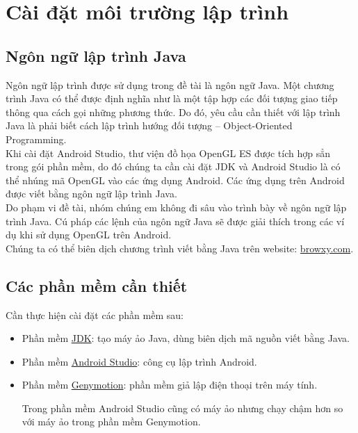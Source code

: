 \documentclass[13pt,a4paper]{extreport}
\begin{document}
\chapter{Cài đặt môi trường lập trình}
\section{Ngôn ngữ lập trình Java}
	Ngôn ngữ lập trình được sử dụng trong đề tài là ngôn ngữ Java. Một chương trình Java có thể được định nghĩa như là một tập hợp các đối tượng giao tiếp thông qua cách gọi những phương thức. Do đó, yêu cầu cần thiết với lập trình Java là phải biết cách lập trình hướng đối tượng -- Object-Oriented Programming.\\
	
	Khi cài đặt Android Studio, thư viện đồ họa OpenGL ES được tích hợp sẳn trong gói phần mềm, do đó chúng ta cần cài đặt JDK và Android Studio là có thể nhúng mã OpenGL vào các ứng dụng Android. Các ứng dụng trên Android được viết bằng ngôn ngữ lập trình Java.\\
	
	Do phạm vi đề tài, nhóm chúng em không đi sâu vào trình bày về ngôn ngữ lập trình Java. Cú pháp các lệnh của ngôn ngữ Java sẽ được giải thích trong các ví dụ khi sử dụng OpenGL trên Android.\\
	
	Chúng ta có thể biên dịch chương trình viết bằng Java trên website: \href{http://browxy.com/}{browxy.com}.

\section{Các phần mềm cần thiết}
	Cần thực hiện cài đặt các phần mềm sau:
	\begin{itemize}
		\item Phần mềm \href{http://www.oracle.com/technetwork/java/javase/downloads/jdk8-downloads-2133151.html}{JDK}: tạo máy ảo Java, dùng biên dịch mã nguồn viết bằng Java.

		\item Phần mềm \href{https://developer.android.com/studio/index.html}{Android Studio}: công cụ lập trình Android.
		
		\item Phần mềm \href{https://www.genymotion.com/}{Genymotion}: phần mềm giả lập điện thoại trên máy tính.
			
			Trong phần mềm Android Studio cũng có máy ảo nhưng chạy chậm hơn so với máy ảo trong phần mềm Genymotion.		
	\end{itemize}
	
\end{document}
